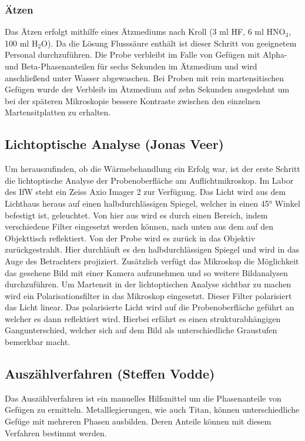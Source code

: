 \documentclass[a4paper, 11pt]{tubsreprt}
\begin{document}
\subsubsection{Ätzen}
Das Ätzen erfolgt mithilfe eines Ätzmediums nach Kroll (3 ml HF, 6 ml HNO$_{3}$, 100 ml H$_{2}$O). Da die Lösung Flusssäure enthält ist dieser Schritt von geeignetem Personal durchzuführen. Die Probe verbleibt im Falle von Gefügen mit Alpha- und Beta-Phasenanteilen für sechs Sekunden im Ätzmedium und wird anschließend unter Wasser abgewaschen. Bei Proben mit rein martensitischen Gefügen wurde der Verbleib im Ätzmedium auf zehn Sekunden ausgedehnt um bei der späteren Mikroskopie bessere Kontraste zwischen den einzelnen Martensitplatten zu erhalten.

\subsection{Lichtoptische Analyse (Jonas Veer)}

Um herauszufinden, ob die Wärmebehandlung ein Erfolg war, ist der erste Schritt die lichtoptische Analyse der Probenoberfläche am Auflichtmikroskop. Im Labor des IfW steht ein Zeiss Axio Imager 2 zur Verfügung. Das Licht wird aus dem Lichthaus heraus auf einen halbdurchlässigen Spiegel, welcher in einen 45° Winkel befestigt ist, geleuchtet. Von hier aus wird es durch einen Bereich, indem verschiedene Filter eingesetzt werden können, nach unten aus dem auf den Objekttisch reflektiert. Von der Probe wird es zurück in das Objektiv zurückgestrahlt. Hier durchläuft es den halbdurchlässigen Spiegel und wird in das Auge des Betrachters projiziert. 
Zusätzlich verfügt das Mikroskop die Möglichkeit das gesehene Bild mit einer Kamera aufzunehmen und so weitere Bildanalysen durchzuführen. 
Um Martensit in der lichtoptischen Analyse sichtbar zu machen wird ein Polarisationsfilter in das Mikroskop eingesetzt. Dieser Filter polarisiert das Licht linear. Das polarisierte Licht wird auf die Probenoberfläche geführt an welcher es dann reflektiert wird. Hierbei erfährt es einen strukturabhängigen Gangunterschied, welcher sich auf dem Bild als unterschiedliche Graustufen bemerkbar macht.

\subsection{Auszählverfahren (Steffen Vodde)} \label{Kapitel Auszählverfahren}
Das Auszählverfahren ist ein manuelles Hilfsmittel um die Phasenanteile von Gefügen zu ermitteln. Metalllegierungen, wie auch Titan, können unterschiedliche Gefüge mit mehreren Phasen ausbilden. Deren Anteile können mit diesem Verfahren bestimmt werden.
\end{document}
